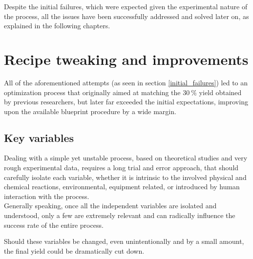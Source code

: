\documentclass{article}
\begin{document}

        Despite the initial failures, which were expected given the experimental nature of the process, all the issues have been 
        successfully addressed and solved later on, as explained in the following chapters. \\




    \clearpage

    \section{Recipe tweaking and improvements\label{recipe_improvement}}

    All of the aforementioned attempts (as seen in section \ref{initial_failures}) led to an optimization process that originally aimed at 
    matching the $30 \ \%$ yield obtained by previous researchers, but later far exceeded the 
    initial expectations, improving upon the available blueprint procedure by a wide margin. 


        \subsection{Key variables\label{key_variables}}

        Dealing with a simple yet unstable process, based on theoretical studies and very rough experimental data, requires a
        long trial and error approach, that should carefully isolate each variable, whether it is intrinsic to the 
        involved physical and chemical reactions, environmental, equipment related, or introduced by human 
        interaction with the process. \\ 

        Generally speaking, once all the independent variables are isolated and understood, only a few are extremely relevant and can 
        radically influence the success rate of the entire process. 

        Should these variables be changed, even unintentionally and by a small amount, the final yield
        could be dramatically cut down. \\ 
\end{document}
